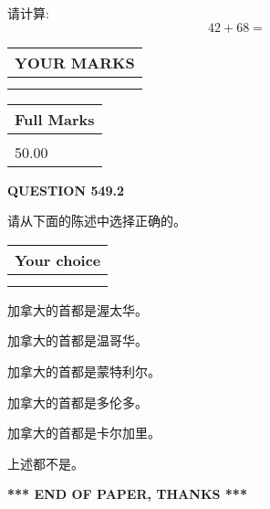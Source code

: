 \documentclass{ctexart}
\begin{document}
  
 
请计算:
\begin{equation}
42 +  %
68 = \nonumber
\end{equation}
 

 

 
  
\vspace{0.2in}
  
\noindent\begin{tabular}{|l|}
\hline
 YOUR MARKS  \\
\hline
 \\ 
 \\ 
\hline
\end{tabular}
\hspace{0.05in} \begin{tabular}{|l|}
\hline
 Full Marks  \\
\hline
 \\ 
50.00 \\
\hline
\end{tabular}
{\textbf{\Large{QUESTION
549.2 
}}}
  
  
请从下面的陈述中选择正确的。
  
  
\noindent\hspace{3.0in} \begin{tabular}{|l|}
\hline
Your choice \\
\hline
 \\ 
 \\ 
\hline
\end{tabular}
  
  
 
 
加拿大的首都是渥太华。
 
 
加拿大的首都是温哥华。
 
 
加拿大的首都是蒙特利尔。
 
 
加拿大的首都是多伦多。
 
 
加拿大的首都是卡尔加里。
 
 
 上述都不是。
 
 
   
   
 \vspace{0.2in}
 
   
   
   
   
\vspace{1.0in} 
{\textbf{\large{ *** END OF PAPER, THANKS *** }}} 
   
\end{document}
